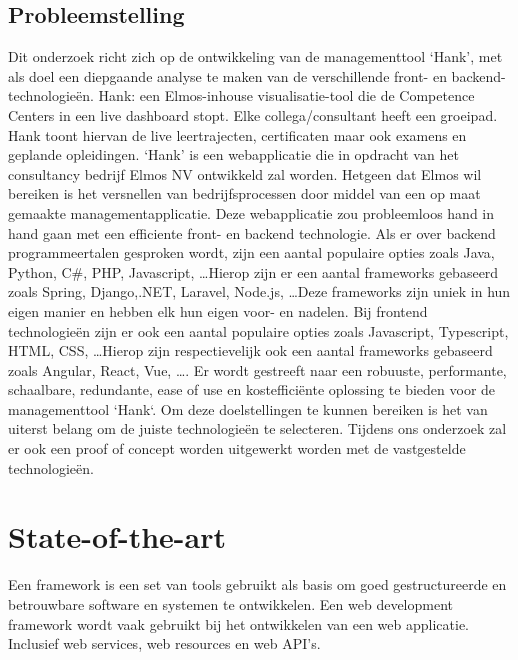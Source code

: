 \documentclass{hogent-article}
\begin{document}
  \subsection{Probleemstelling}%
  \label{sub:probleemstelling}
  Dit onderzoek richt zich op de ontwikkeling van de managementtool `Hank', met als doel een diepgaande analyse te maken van de verschillende front- en backend-technologieën. Hank: een Elmos-inhouse visualisatie-tool die de Competence Centers in een live dashboard stopt. Elke collega/consultant heeft een groeipad. Hank toont hiervan de live leertrajecten, certificaten maar ook examens en geplande opleidingen. `Hank' is een webapplicatie die in opdracht van het consultancy bedrijf Elmos NV ontwikkeld zal worden. Hetgeen dat Elmos wil bereiken is het versnellen van bedrijfsprocessen door middel van een op maat gemaakte managementapplicatie. Deze webapplicatie zou probleemloos hand in hand gaan met een efficiente front- en backend technologie.
  \bigskip
  Als er over backend programmeertalen gesproken wordt, zijn een aantal populaire opties zoals Java, Python, C\#, PHP, Javascript, \ldots Hierop zijn er een aantal frameworks gebaseerd zoals Spring, Django,.NET, Laravel, Node.js, \ldots Deze frameworks zijn uniek in hun eigen manier en hebben elk hun eigen voor- en nadelen. Bij frontend technologieën zijn er ook een aantal populaire opties zoals Javascript, Typescript, HTML, CSS, \ldots Hierop zijn respectievelijk ook een aantal frameworks gebaseerd zoals Angular, React, Vue, \ldots.
  \bigskip
  Er wordt gestreeft naar een robuuste, performante, schaalbare, redundante, ease of use en kostefficiënte oplossing te bieden voor de managementtool `Hank`. Om deze doelstellingen te kunnen bereiken is het van uiterst belang om de juiste technologieën te selecteren. Tijdens ons onderzoek zal er ook een proof of concept worden uitgewerkt worden met de vastgestelde technologieën.


\section{State-of-the-art}%
\label{sec:state-of-the-art}

Een framework is een set van tools gebruikt als basis om goed gestructureerde en betrouwbare software en systemen te ontwikkelen. Een web development framework wordt vaak gebruikt bij het ontwikkelen van een web applicatie. Inclusief web services, web resources en web API's.
\end{document}
